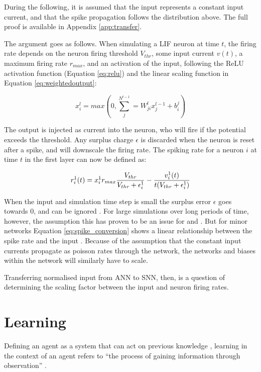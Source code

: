 \documentclass[report.tex]{subfiles}
\begin{document}
During the following, it is assumed that the input represents a constant
input current, and that the spike propagation follows the distribution
above.
The full proof is available in Appendix \ref{app:transfer}.

The argument goes as follows.
When simulating a LIF
neuron at time $t$, the firing rate depends on the neuron firing threshold $V_{thr}$,
some input current $v(t)$, a maximum
firing rate $r_{max}$, and an activation of the input, following the
ReLU activation function (Equation \ref{eq:relu}) and 
the linear scaling function in Equation \ref{eq:weightedoutput}:

\begin{equation}
x_i^l = max\left(0, \sum^{N^{l - 1}}_j= W^l_{ji} x_j^{l - 1} + b_i^j\right)
  \label{eq:relu_activation}
\end{equation}

The output is injected as current into the neuron, who will fire if the
potential exceeds the threshold.
Any surplus charge $\epsilon$ is discarded when the neuron is reset
after a spike, and will downscale the firing rate.
The spiking rate for a neuron $i$ at time $t$ in the first layer can
now be defined as:

\begin{equation}
r_i^1(t) = x_i^1 r_{max} {V_{thr} \over V_{thr} + \epsilon_i^1 } - {v_i^1(t) \over t (V_{thr} + \epsilon_i^1) }
\label{eq:spike_conversion}
\end{equation}

When the input and simulation time step is small the surplus
error $\epsilon$ goes towards 0, and can be ignored \cite{Rueckauer2017}.
For large simulations over long periods of time, however, the assumption
this has proven to be an issue for \citeauthor{Diehl2015} and
\citeauthor{Rueckauer2017}.
But for minor networks Equation \ref{eq:spike_conversion} shows a 
linear relationship between the spike rate and the input
\cite{Rueckauer2017}.
Because of the assumption that the constant input currents propagate as poisson rates
through the network, the networks and biases within the network will similarly
have to scale.

Transferring normalised input from \gls{ANN} to \gls{SNN}, then, is
a question of determining the scaling factor between the input and neuron
firing rates.

\section{Learning}  \label{sec:learning}
Defining an \gls{agent} as a system that can act on previous knowledge
\cite{Russel2007}, learning in the context of an \gls{agent}
refers to ``the process of gaining
information through observation'' \cite{sep:learning-formal}.
\end{document}
